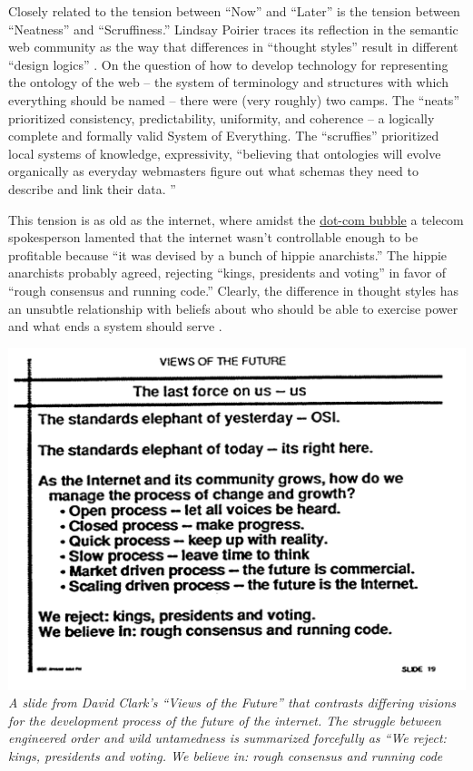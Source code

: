 \documentclass[10pt]{tufte-book}
\begin{document}
Closely related to the tension between ``Now'' and ``Later'' is the
tension between ``Neatness'' and ``Scruffiness.'' Lindsay Poirier traces
its reflection in the semantic web community as the way that differences
in ``thought styles'' result in different ``design logics'' \citep{poirierTurnScruffyEthnographic2017} . On the question of how to
develop technology for representing the ontology of the web -- the
system of terminology and structures with which everything should be
named -- there were (very roughly) two camps. The ``neats'' prioritized
consistency, predictability, uniformity, and coherence -- a logically
complete and formally valid System of Everything. The ``scruffies''
prioritized local systems of knowledge, expressivity, ``believing that
ontologies will evolve organically as everyday webmasters figure out
what schemas they need to describe and link their data. \citep{poirierTurnScruffyEthnographic2017} ''

This tension is as old as the internet, where amidst the
\href{https://en.wikipedia.org/wiki/Dot-com_bubble}{dot-com bubble} a
telecom spokesperson lamented that the internet wasn't controllable
enough to be profitable because ``it was devised by a bunch of hippie
anarchists.'' \citep{hiltzikTamingWildWild2001}  The hippie
anarchists probably agreed, rejecting ``kings, presidents and voting''
in favor of ``rough consensus and running code.'' Clearly, the
difference in thought styles has an unsubtle relationship with beliefs
about who should be able to exercise power and what ends a system should
serve \citep{larsenPoliticalNatureTCP2012} .

\includegraphics[width=\linewidth]{../assets/images/clark-slide.png} \emph{A
slide from David Clark's ``Views of the Future''\citep{clarkCloudyCrystalBall1992}  that contrasts differing visions for the
development process of the future of the internet. The struggle between
engineered order and wild untamedness is summarized forcefully as ``We
reject: kings, presidents and voting. We believe in: rough consensus and
running code}
\end{document}
